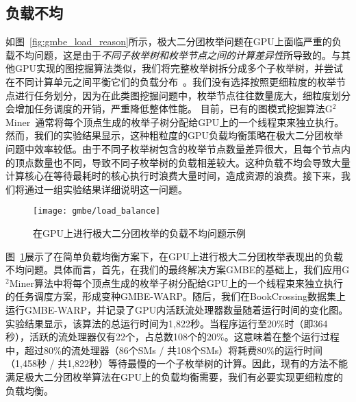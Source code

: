 \subsection{负载不均}

如图~\ref{fig:gmbe_load_reason}所示，极大二分团枚举问题在GPU上面临严重的负载不均问题，这是由于\emph{不同子枚举树和枚举节点之间的计算差异性}所导致的。与其他GPU实现的图挖掘算法类似，我们将完整枚举树拆分成多个子枚举树，并尝试在不同计算单元之间平衡它们的负载分布~\cite{g2miner22,Kclique22,Graphset23}。我们没有选择按照更细粒度的枚举节点进行任务划分，因为在此类图挖掘问题中，枚举节点往往数量庞大，细粒度划分会增加任务调度的开销，严重降低整体性能。
目前，已有的图模式挖掘算法G$^2$Miner~\cite{g2miner22}通常将每个顶点生成的枚举子树分配给GPU上的一个线程束来独立执行。然而，我们的实验结果显示，这种粗粒度的GPU负载均衡策略在极大二分团枚举问题中效率较低。由于不同子枚举树包含的枚举节点数量差异很大，且每个节点内的顶点数量也不同，导致不同子枚举树的负载相差较大。这种负载不均会导致大量计算核心在等待最耗时的核心执行时浪费大量时间，造成资源的浪费。接下来，我们将通过一组实验结果详细说明这一问题。



\begin{figure} [H]
  \center
		\texttt{[image: gmbe/load\_balance]}
	\caption{在GPU上进行极大二分团枚举的负载不均问题示例}
	\label{fig:gmbe_load_example}
\end{figure}

\begin{example}

  图~\ref{fig:gmbe_load_example}展示了在简单负载均衡方案下，在GPU上进行极大二分团枚举表现出的负载不均问题。具体而言，首先，在我们的最终解决方案GMBE的基础上，我们应用G$^2$Miner算法中将每个顶点生成的枚举子树分配给GPU上的一个线程束来独立执行的任务调度方案，形成变种GMBE-WARP。随后，我们在BookCrossing数据集上运行GMBE-WARP，并记录了GPU内活跃流处理器数量随着运行时间的变化图。实验结果显示，该算法的总运行时间为1,822秒。当程序运行至20\%时（即364秒），活跃的流处理器仅有22个，占总数108个的20\%。这意味着在整个运行过程中，超过80\%的流处理器（86个SMs / 共108个SMs）将耗费80\%的运行时间（1,458秒 / 共1,822秒）等待最慢的一个子枚举树的计算。因此，现有的方法不能满足极大二分团枚举算法在GPU上的负载均衡需要，我们有必要实现更细粒度的负载均衡。
  
\end{example}


